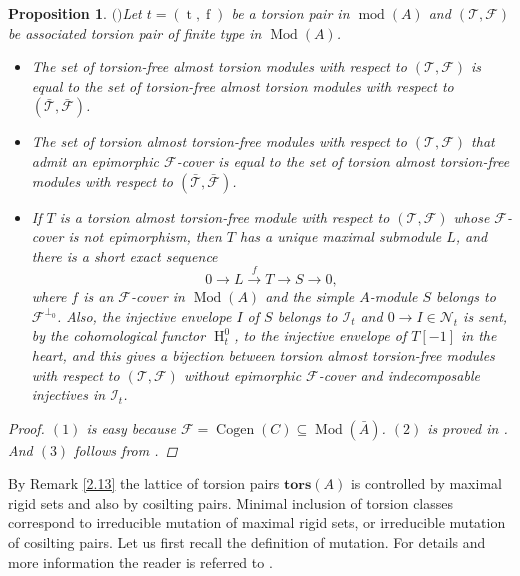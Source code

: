 \documentclass[12pt]{amsart}
\numberwithin{equation}{section}
\newtheorem{proposition}[lemma]{Proposition}
\theoremstyle{definition}
\DeclareMathOperator{\Mod}{Mod}
\DeclareMathOperator{\modd}{mod}
\DeclareMathOperator{\Cogen}{Cogen}
\DeclareMathOperator{\ts}{t}
\DeclareMathOperator{\fs}{f}
\DeclareMathOperator{\HH}{H}
\newtheorem*{theorem 0*}{Theorem}
\newtheorem*{theorem a*}{Theorem A}
\newtheorem*{theorem b*}{Theorem B}
\numberwithin{diagram}{section}
\begin{document}
	\begin{proposition}$($\cite[Section 4]{ALS2}$)$\label{3.11}
	Let $t=(\ts,\fs)$ be a torsion pair in $\modd(A)$ and $(\mathcal{T},\mathcal{F})$ be associated torsion pair of finite type in $\Mod(A)$.
	\begin{itemize}
	\item[(1)]
	The set of torsion-free almost torsion modules with respect to $(\mathcal{T},\mathcal{F})$ is equal to the set of torsion-free almost torsion modules with respect to $(\bar{\mathcal{T}},\bar{\mathcal{F}})$.
	\item[(2)]
	The set of torsion almost torsion-free modules with respect to $(\mathcal{T},\mathcal{F})$ that admit an epimorphic $\mathcal{F}$-cover is equal to the set of torsion almost torsion-free modules with respect to $(\bar{\mathcal{T}},\bar{\mathcal{F}})$.
	\item[(3)]
	If $T$ is a torsion almost torsion-free module with respect to $(\mathcal{T},\mathcal{F})$ whose $\mathcal{F}$-cover is not epimorphism, then $T$ has a unique maximal submodule $L$, and there is a short exact sequence 
	\[0\rightarrow L\overset{f}{\longrightarrow}T\longrightarrow S\rightarrow 0,\]
	where $f$ is an $\mathcal{F}$-cover in $\Mod(A)$ and the simple $A$-module $S$ belongs to $\mathcal{F}^{\bot_0}$. Also, the injective envelope $I$ of $S$ belongs to $\mathcal{I}_t$ and $0\rightarrow I\in \mathcal{N}_t$ is sent, by the cohomological functor $\HH^0_t$, to the injective envelope of $T[-1]$ in the heart, and this gives a bijection between torsion almost torsion-free modules with respect to $(\mathcal{T},\mathcal{F})$ without epimorphic $\mathcal{F}$-cover and indecomposable injectives in $\mathcal{I}_t$.
	\end{itemize}
    \begin{proof}
    $(1)$ is easy because $\mathcal{F}=\Cogen(C)\subseteq\Mod(\bar{A})$.
    $(2)$ is proved in \cite[Proposition 4.5]{ALS2}. And $(3)$ follows from \cite[Proposition 4.6 and Theorem 4.10]{ALS2}.
    \end{proof}
	\end{proposition}
	By Remark \ref{2.13} the lattice of torsion pairs $\textbf{tors}(A)$ is controlled by maximal rigid sets and also by cosilting pairs. Minimal inclusion of torsion classes correspond to irreducible mutation of maximal rigid sets, or irreducible mutation of cosilting pairs. Let us first recall the definition of mutation. For details and more information the reader is referred to \cite{ALS2}.
	
\end{document}
